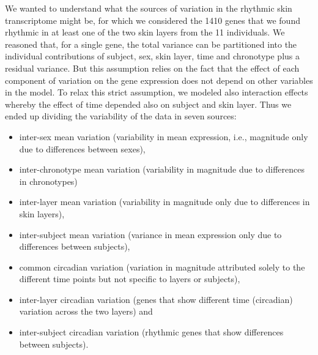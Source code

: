 {We wanted to understand what the sources of variation in the rhythmic skin transcriptome might be, for which we considered the 1410 genes that we found rhythmic in at least one of the two skin layers from the 11 individuals. We reasoned that, for a single gene, the total variance can be partitioned into the individual contributions of subject, sex, skin layer, time and chronotype plus a residual variance. But this assumption relies on the fact that the effect of each component of variation on the gene expression does not depend on other variables in the model. To relax this strict assumption, we modeled also interaction effects whereby the effect of time depended also on subject and skin layer. Thus we ended up dividing the variability of the data in seven sources: 
\begin{itemize}
	\item inter-sex mean variation (variability in mean expression, i.e., magnitude only due to differences between sexes),
	\item inter-chronotype mean variation (variability in magnitude due to differences in chronotypes)
	\item inter-layer mean variation (variability in magnitude only due to differences in skin layers),
	\item inter-subject mean variation (variance in mean expression only due to differences between subjects), 
	\item common circadian variation (variation in magnitude attributed solely to the different time points but not specific to layers or subjects), 
	\item inter-layer circadian variation (genes that show different time (circadian) variation across the two layers) and
	\item inter-subject circadian variation (rhythmic genes that show differences between subjects).
\end{itemize} 

}
